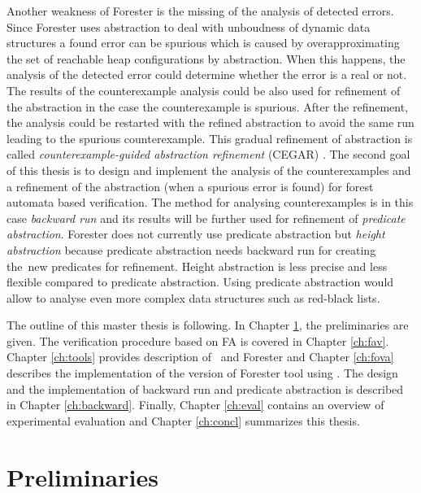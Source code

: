 Another weakness of Forester is the missing of the analysis of detected errors.
Since Forester uses abstraction to deal with unboudness of dynamic data structures
a found error can be spurious which is caused by overapproximating
the set of reachable heap configurations by abstraction.
When this happens, the analysis of the detected error could determine
whether the error is a real or not.
The results of the counterexample analysis could be also used for refinement of the abstraction
in the case the counterexample is spurious.
After the refinement, the analysis could be restarted with the refined abstraction
to avoid the same run leading to the spurious counterexample.
This gradual refinement of abstraction is called \emph{counterexample-guided abstraction refinement} (CEGAR) \cite{cegar}.
The second goal of this thesis is to design and implement the analysis of the counterexamples
and a refinement of the abstraction (when a spurious error is found) for forest automata based verification.
The method for analysing counterexamples is in this case \emph{backward run}
and its results will be further used for refinement of \emph{predicate abstraction}.
Forester does not currently use predicate abstraction but \emph{height abstraction}
because predicate abstraction needs backward run for creating the~new predicates for refinement.
Height abstraction is less precise and less flexible compared to predicate abstraction.
Using predicate abstraction would allow to analyse even more complex data structures such as red-black lists.

The outline of this master thesis is following.
In Chapter \ref{ch:prel}, the preliminaries are given.
The verification procedure based on FA is covered in Chapter \ref{ch:fav}.
Chapter \ref{ch:tools} provides description of \vata\ and Forester
and Chapter \ref{ch:fova} describes the implementation of the version of Forester tool using \vata.
The design and the implementation of backward run and predicate abstraction
is described in Chapter \ref{ch:backward}.
Finally, Chapter \ref{ch:eval} contains an overview of experimental evaluation and 
Chapter \ref{ch:concl} summarizes this thesis.

\chapter{Preliminaries}
\label{ch:prel}


